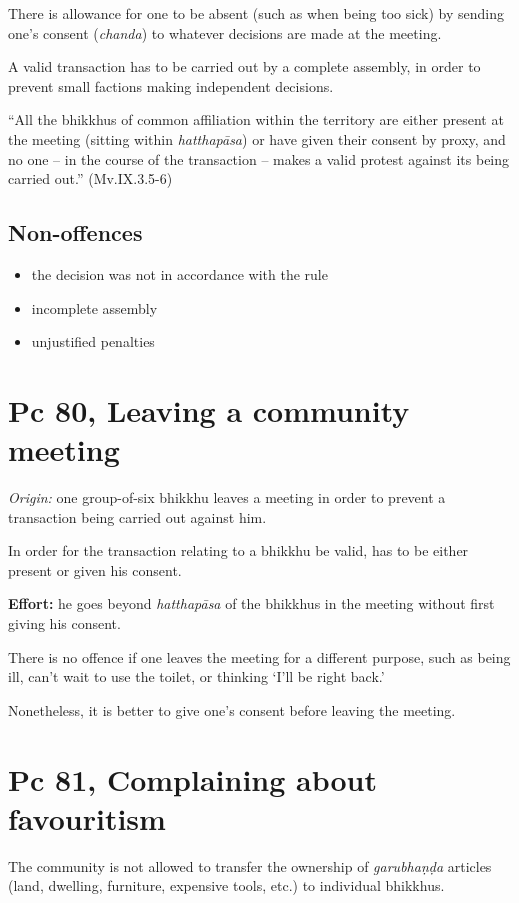 There is allowance for one to be absent (such as when being too sick) by
sending one's consent (\emph{chanda}) to whatever decisions are made at
the meeting.

A valid transaction has to be carried out by a complete assembly, in
order to prevent small factions making independent decisions.

``All the bhikkhus of common affiliation within the territory are either
present at the meeting (sitting within \emph{hatthapāsa}) or have given
their consent by proxy, and no one -- in the course of the transaction
-- makes a valid protest against its being carried out.'' (Mv.IX.3.5-6)

\subsection{Non-offences}

\begin{itemize}
\tightlist
\item
  the decision was not in accordance with the rule
\item
  incomplete assembly
\item
  unjustified penalties
\end{itemize}

\section{Pc 80, Leaving a community meeting}

\emph{Origin:} one group-of-six bhikkhu leaves a meeting in order to
prevent a transaction being carried out against him.

In order for the transaction relating to a bhikkhu be valid, has to be
either present or given his consent.

\textbf{Effort:} he goes beyond \emph{hatthapāsa} of the bhikkhus in the
meeting without first giving his consent.

There is no offence if one leaves the meeting for a different purpose,
such as being ill, can't wait to use the toilet, or thinking `I'll be
right back.'

Nonetheless, it is better to give one's consent before leaving the
meeting.

\section{Pc 81, Complaining about favouritism}

The community is not allowed to transfer the ownership of
\emph{garubhaṇḍa} articles (land, dwelling, furniture, expensive tools,
etc.) to individual bhikkhus.

